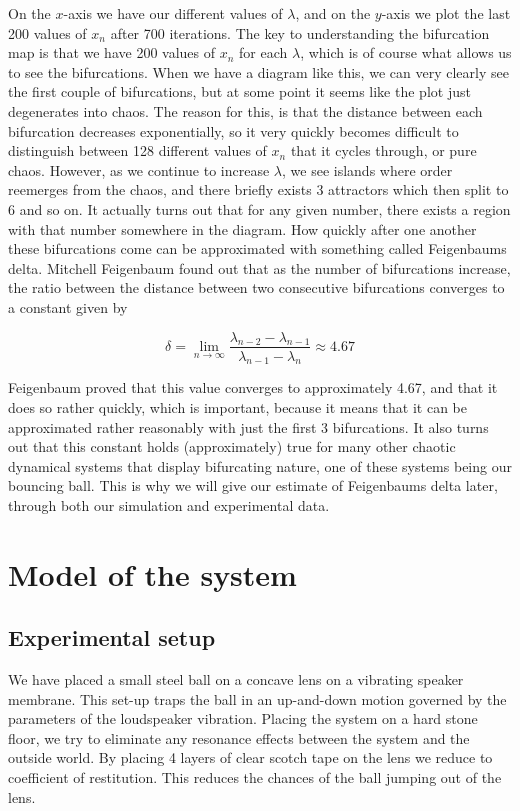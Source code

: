 \documentclass[12pt,oneside,a4paper]{article}
\numberwithin{equation}{section}
\begin{document}
{{{{On the $x$-axis we have our different values of $\lambda$, and on the $y$-axis we plot the last 200 values of $x_n$ after 700 iterations. The key to understanding the bifurcation map is that we have 200 values of $x_n$ for each $\lambda$, which is of course what allows us to see the bifurcations. When we have a diagram like this, we can very clearly see the first couple of bifurcations, but at some point it seems like the plot just degenerates into chaos. The reason for this, is that the distance between each bifurcation decreases exponentially, so it very quickly becomes difficult to distinguish between 128 different values of $x_n$ that it cycles through, or pure chaos. However, as we continue to increase $\lambda$, we see islands where order reemerges from the chaos, and there briefly exists 3 attractors which then split to 6 and so on. It actually turns out that for any given number, there exists a region with that number somewhere in the diagram. How quickly after one another these bifurcations come can be approximated with something called Feigenbaums delta. Mitchell Feigenbaum found out that as the number of bifurcations increase, the ratio between the distance between two consecutive bifurcations converges to a constant given by

\begin{equation}
\delta=\lim_{n \to \infty} \frac{\lambda_{n-2} - \lambda_{n-1}}{\lambda_{n-1}-\lambda_n} \approx 4.67
\end{equation}

Feigenbaum proved that this value converges to approximately 4.67, and that it does so rather quickly, which is important, because it means that it can be approximated rather reasonably with just the first 3 bifurcations. It also turns out that this constant holds (approximately) true for many other chaotic dynamical systems that display bifurcating nature, one of these systems being our bouncing ball. This is why we will give our estimate of Feigenbaums delta later, through both our simulation and experimental data.




\section{Model of the system}
\label{modelling}
\subsection{Experimental setup}
We have placed a small steel ball on a concave lens on a vibrating speaker membrane. This set-up traps the ball in an up-and-down motion governed by the parameters of the loudspeaker vibration. Placing the system on a hard stone floor, we try to eliminate any resonance effects between the system and the outside world. By placing 4 layers of clear scotch tape on the lens we reduce to coefficient of restitution. This reduces the chances of the ball jumping out of the lens. 
}}}}
\end{document}
